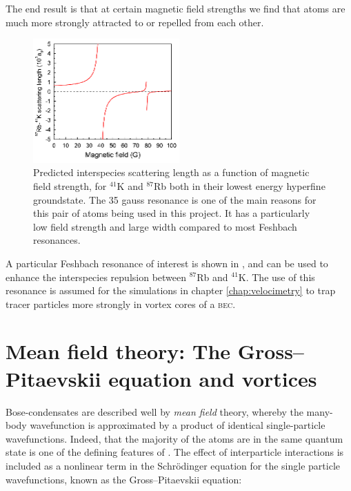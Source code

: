 The end result is that at certain magnetic field strengths we find that atoms are much more strongly attracted to or repelled from each other.

\begin{figure}%
\begin{center}
\includegraphics[width=0.5\textwidth]{figures/unsorted/feshKRb.png}
\caption{Predicted interspecies scattering length \cite{thalhammer_double_2008} as a function of magnetic field strength, for $^{41}$K and $^{87}$Rb both in their lowest energy hyperfine groundstate. The 35 gauss resonance is one of the main reasons for this pair of atoms being used in this project. It has a particularly low field strength and large width compared to most Feshbach resonances.}\label{fig:feshKRb}
\end{center}
\end{figure}

A particular Feshbach resonance of interest is shown in , and can be used to enhance the interspecies repulsion between $^{87}$Rb and $^{41}$K. The use of this resonance is assumed for the simulations in chapter \ref{chap:velocimetry} to trap tracer particles more strongly in vortex cores of a \textsc{bec}.

\section{Mean field theory: The Gross--Pitaevskii equation and vortices}\label{sec:mean_field_theory}

Bose-condensates are described well by \emph{mean field} theory, whereby the many-body wavefunction is approximated by a product of identical single-particle wavefunctions. Indeed, that the majority of the atoms are in the same quantum state is one of the defining features of \bec. The effect of interparticle interactions is included as a nonlinear term in the Schr\"odinger equation for the single particle wavefunctions, known as the Gross--Pitaevskii equation:

